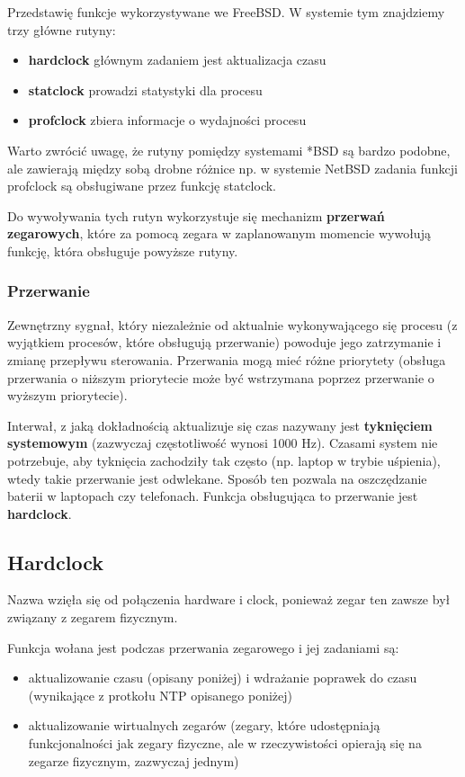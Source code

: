 \documentclass[shortabstract]{iithesis}
\theoremstyle{definition} \newtheorem*{definition}{Definicja}
\theoremstyle{definition} \newtheorem*{example}{Przykład}
\theoremstyle{definition} \newtheorem*{remark}{Uwaga}
\begin{document}
Przedstawię funkcje wykorzystywane we FreeBSD. W systemie tym znajdziemy trzy główne rutyny:

\begin{itemize}
    \item \textbf{hardclock} głównym zadaniem jest aktualizacja czasu
    \item \textbf{statclock} prowadzi statystyki dla procesu
    \item \textbf{profclock} zbiera informacje o wydajności procesu
\end{itemize}

Warto zwrócić uwagę, że rutyny pomiędzy systemami *BSD są bardzo podobne, ale zawierają między sobą drobne różnice np. w systemie NetBSD zadania funkcji profclock są obsługiwane przez funkcję statclock.

Do wywoływania tych rutyn wykorzystuje się mechanizm \textbf{przerwań zegarowych}, które za pomocą zegara w zaplanowanym momencie wywołują funkcję, która obsługuje powyższe rutyny.

\subsubsection{Przerwanie}
Zewnętrzny sygnał, który niezależnie od aktualnie wykonywającego się procesu (z wyjątkiem procesów, które obsługują przerwanie) powoduje jego zatrzymanie i zmianę przepływu sterowania. Przerwania mogą mieć różne priorytety (obsługa przerwania o niższym priorytecie może być wstrzymana poprzez przerwanie o wyższym priorytecie).

Interwał, z jaką dokładnością aktualizuje się czas nazywany jest \textbf{tyknięciem systemowym} (zazwyczaj częstotliwość wynosi 1000 Hz). Czasami system nie potrzebuje, aby tyknięcia zachodziły tak często (np. laptop w trybie uśpienia), wtedy takie przerwanie jest odwlekane. Sposób ten pozwala na oszczędzanie baterii w laptopach czy telefonach. Funkcja obsługująca to przerwanie jest \textbf{hardclock}.

\subsection{Hardclock}

Nazwa wzięła się od połączenia hardware i clock, ponieważ zegar ten zawsze był związany z zegarem fizycznym.

Funkcja wołana jest podczas przerwania zegarowego i jej zadaniami \cite{bib:freebsd-os} są:

\begin{itemize}
    \item aktualizowanie czasu (opisany poniżej) i wdrażanie poprawek do czasu (wynikające z protkołu NTP opisanego poniżej)
    \item aktualizowanie wirtualnych zegarów (zegary, które udostępniają funkcjonalności jak zegary fizyczne, ale w rzeczywistości opierają się na zegarze fizycznym, zazwyczaj jednym)
\end{itemize} 
\end{document}
